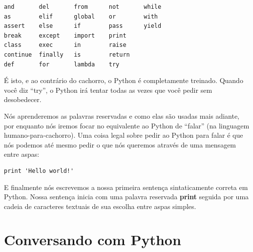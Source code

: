 \beforeverb
\begin{verbatim}
and       del       from      not       while    
as        elif      global    or        with     
assert    else      if        pass      yield    
break     except    import    print              
class     exec      in        raise              
continue  finally   is        return             
def       for       lambda    try
\end{verbatim}
\afterverb
%

É isto, e ao contrário do cachorro, o Python é completamente treinado.
Quando você diz ``try'', o Python irá tentar todas as vezes que você pedir
sem desobedecer.
%

Nós aprenderemos as palavras reservadas e como elas são usadas mais adiante,
por enquanto nós iremos focar no equivalente ao Python de ``falar'' (na 
linguagem humano-para-cachorro). Uma coisa legal sobre pedir ao Python para falar
é que nós podemos até mesmo pedir o que nós queremos através de uma mensagem
entre aspas: 
%

\beforeverb
\begin{verbatim}
print 'Hello world!'
\end{verbatim}
\afterverb
%

E finalmente nós escrevemos a nossa primeira sentença sintaticamente correta em Python.
Nossa sentença inicia com uma palavra reservada {\bf print} seguida por
uma cadeia de caracteres textuais de sua escolha entre aspas simples.
%

\section{Conversando com Python}
%

